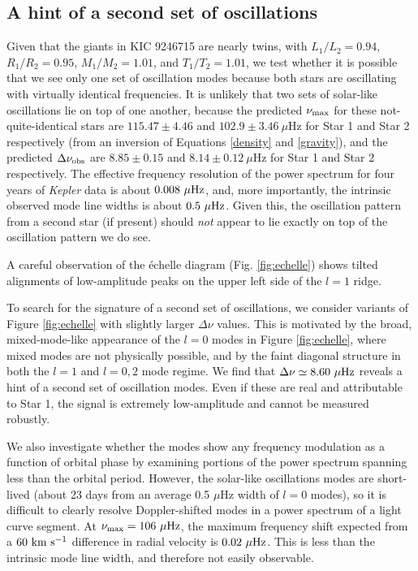 \subsection{A hint of a second set of oscillations}\label{search}
\label{subsubsec_second_osc}

Given that the giants in KIC 9246715 are nearly twins, with $L_1/L_2 = 0.94$, $R_1/R_2 = 0.95$, $M_1/M_2 = 1.01$, and $T_1/T_2 = 1.01$, we test whether it is possible that we see only one set of oscillation modes because both stars are oscillating with virtually identical frequencies. It is unlikely that two sets of solar-like oscillations lie on top of one another, because the predicted $\nu_{\rm{max}}$ for these not-quite-identical stars are $115.47 \pm 4.46$ and $102.9 \pm 3.46\ \mu$Hz for Star 1 and Star 2 respectively (from an inversion of Equations \ref{density} and \ref{gravity}), and the predicted $\Delta\nu_{\rm{obs}}$ are $8.85 \pm 0.15$ and $8.14 \pm 0.12 \ \mu$Hz for Star 1 and Star 2 respectively. The effective frequency resolution of the power spectrum for four years of \emph{Kepler} data is about $0.008 \ \mu \rm{Hz}$, and, more importantly, the intrinsic observed mode line widths is about $0.5 \ \mu \rm{Hz}$. Given this, the oscillation pattern from a second star (if present) should \emph{not} appear to lie exactly on top of the oscillation pattern we do see.

A careful observation of the \'echelle diagram (Fig. \ref{fig:echelle}) shows tilted alignments of low-amplitude peaks on the upper left side of the $l=1$ ridge. 

To search for the signature of a second set of oscillations, we consider variants of Figure \ref{fig:echelle} with slightly larger $\Delta \nu$ values. This is motivated by the broad, mixed-mode-like appearance of the $l=0$ modes in Figure \ref{fig:echelle}, where mixed modes are not physically possible, and by the faint diagonal structure in both the $l=1$ and $l=0,2$ mode regime. We find that $\Delta \nu \simeq 8.60 \ \mu \rm{Hz}$ reveals a hint of a second set of oscillation modes. Even if these are real and attributable to Star 1, the signal is extremely low-amplitude and cannot be measured robustly.

We also investigate whether the modes show any frequency modulation as a function of orbital phase by examining portions of the power spectrum spanning less than the orbital period. However, the solar-like oscillations modes are short-lived (about 23 days from an average 0.5 $\mu$Hz width of $l=0$ modes), so it is difficult to clearly resolve Doppler-shifted modes in a power spectrum of a light curve segment. At $\nu_{\rm{max}} = 106 \ \mu \rm{Hz}$, the maximum frequency shift expected from a $60 \ \rm{km} \ \rm{s}^{-1}$ difference in radial velocity is $0.02 \ \mu \rm{Hz}$. This is less than the intrinsic mode line width, and therefore not easily observable.

  
  
  
  
  